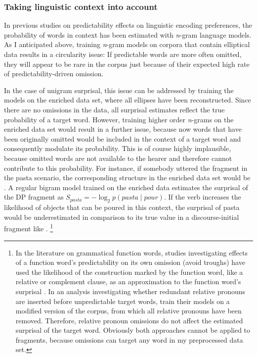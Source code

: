 \subsubsection{Taking linguistic context into account}
\label{sec:scripts-production-surprisal-context}

In previous studies on predictability effects on linguistic encoding preferences, the probability of words in context has been estimated with \textit{n}-gram language models. As I anticipated above, training \textit{n}-gram models on corpora that contain elliptical data results in a circularity issue: If predictable words are more often omitted, they will appear to be rare in the corpus just because of their expected high rate of predictability-driven omission. 

In the case of unigram surprisal, this issue can be addressed by training the models on the enriched data set, where all ellipses have been reconstructed. Since there are no omissions in the data, all surprisal estimates reflect the true probability of a target word. However, training higher order \textit{n}-grams on the enriched data set would result in a further issue, because now words that have been originally omitted would be included in the context of a target word and consequently modulate its probability. This is of course highly implausible, because omitted words are not available to the hearer and therefore cannot contribute to this probability. For instance, if somebody uttered the fragment \Next[a] in the pasta scenario, the corresponding structure in the enriched data set would be \Next[b]. A regular bigram model trained on the enriched data estimates the surprisal of the DP fragment as $S_{pasta} = -\log_2 p(pasta\mathbin{|}pour)$. If the verb increases the likelihood of objects that can be poured in this context, the surprisal of pasta would be underestimated in comparison to its true value in a discourse-initial fragment like \Next[a].%
%
\footnote{In the literature on grammatical function words, studies investigating effects of a function word's predictability on its own omission (avoid troughs) have used the likelihood of the construction marked by the function word, like a relative  or complement clause, as an approximation to the function word's surprisal \citep{levy.jaeger2007, jaeger2010}. In an analysis investigating whether redundant relative pronouns are inserted before unpredictable target words, \citet{levy.jaeger2007} train their models on a modified version of the corpus, from which all relative pronouns have been removed. Therefore, relative pronoun omissions do not affect the estimated surprisal of the target word. Obviously both approaches cannot be applied to fragments, because omissions can target any word in my preprocessed data set.}\afterfn%
%

